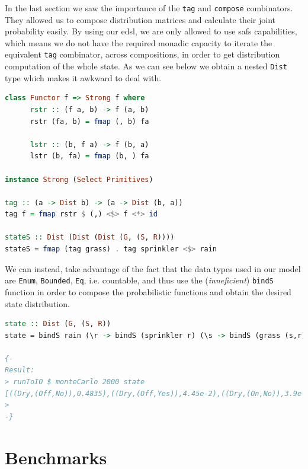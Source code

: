 \documentclass[
  oneside,
  11pt, a4paper,
  footinclude=true,
  headinclude=true,
  cleardoublepage=empty
]{scrbook}
\theoremstyle{definition}
\theoremstyle{definition}
\begin{document}
        In the last section we saw the importance of the \texttt{tag} and \texttt{compose} combinators. They allowed us to compose distribution matrices and calculate their joint probability easily. By using our \gls{edsl}, we are only allowed to use \glspl{saf} capabilities, which means we do not have the required monadic capacity to iterate the equivalent \texttt{tag} combinator, across compositions, in order to get distribution computation of the whole state. As we can see below we obtain a nested  \texttt{Dist} type which makes it awkward to deal with.
        
        \begin{lstlisting}[language=Haskell, caption={\texttt{tag} combinator}, captionpos=b]
class Functor f => Strong f where
      rstr :: (f a, b) -> f (a, b)
      rstr (fa, b) = fmap (, b) fa

      lstr :: (b, f a) -> f (b, a)
      lstr (b, fa) = fmap (b, ) fa

instance Strong (Select Primitives)
 
tag :: (a -> Dist b) -> (a -> Dist (b, a))
tag f = fmap rstr $ (,) <$> f <*> id

stateS :: Dist (Dist (Dist (G, (S, R))))
stateS = fmap (tag grass) . tag sprinkler <$> rain
        \end{lstlisting}{}
        
        We can instead, take advantage of the fact that the data types used in our model are \texttt{Enum}, \texttt{Bounded}, \texttt{Eq}, i.e. countable, and thus use the (\textit{inneficient}) \texttt{bindS} function in order to compose the probabilistic functions and obtain the desired state distribution.
        
        \begin{lstlisting}[language=Haskell, caption={State distribution}, captionpos=b]
state :: Dist (G, (S, R))
state = bindS rain (\r -> bindS (sprinkler r) (\s -> bindS (grass (s,r)) (\g -> pure (g, (s,r)))))

{-
Result:
> runToIO $ monteCarlo 2000 state
[((Dry,(Off,No)),0.4835),((Dry,(Off,Yes)),4.45e-2),((Dry,(On,No)),3.9e-2),((Wet,(Off,Yes)),0.151),((Wet,(On,No)),0.28),((Wet,(On,Yes)),2.0e-3)]
>
-}
        \end{lstlisting}{}
        
        \section{Benchmarks}
        
\end{document}
